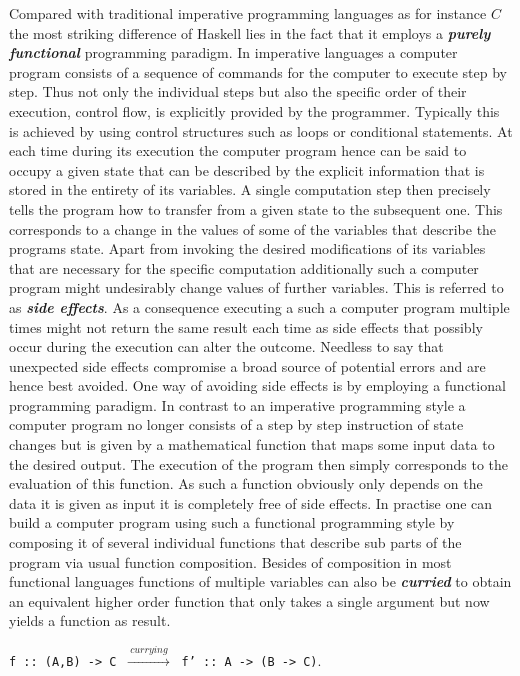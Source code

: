 \documentclass[a4paper,12pt, DIV=14, BCOR=5mm, twoside, headsepline]{scrbook}
\begin{document}
Compared with traditional imperative programming languages as for instance $C$ the most striking difference of Haskell lies in the fact that it employs a \textbf{\textit{purely functional}} programming paradigm. In imperative languages a computer program consists of a sequence of commands for the computer to execute step by step. Thus not only the individual steps but also the specific order of their execution, control flow, is explicitly provided by the programmer. Typically this is achieved by using control structures such as loops or conditional statements. At each time during its execution the computer program hence can be said to occupy a given state that can be described by the explicit information that is stored in the entirety of its variables. A single computation step then precisely tells the program how to transfer from a given state to the subsequent one. This corresponds to a change in the values of some of the variables that describe the programs state. Apart from invoking the desired modifications of its variables that are necessary for the specific computation additionally such a computer program might undesirably change values of further variables. This is referred to as \textit{\textbf{side effects}}. As a consequence executing a such a computer program multiple times might not return the same result each time as side effects that possibly occur during the execution can alter the outcome. Needless to say that unexpected side effects compromise a broad source of potential errors and are hence best avoided. One way of avoiding side effects is by employing a functional programming paradigm. In contrast to an imperative programming style a computer program no longer consists of a step by step instruction of state changes but is given by a mathematical function that maps some input data to the desired output. The execution of the program then simply corresponds to the evaluation of this function. As such a function obviously only depends on the data it is given as input it is completely free of side effects. In practise one can build a computer program using such a functional programming style by composing it of several individual functions that describe sub parts of the program via usual function composition. Besides of composition in most functional languages functions of multiple variables can also be  \textit{\textbf{curried}} to obtain an equivalent higher order function that only takes a single argument but now yields a function as result. 
\begin{center}
    \texttt{f :: (A,B) -> C} $\ \xrightarrow{ \ currying \ } \ $
    \texttt{f' :: A -> (B -> C)}.
\end{center}
\end{document}
